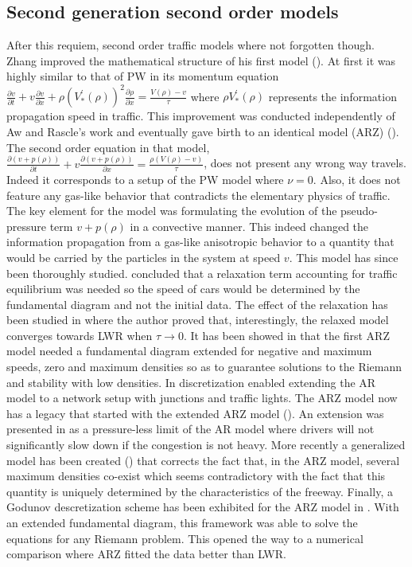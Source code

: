 \documentclass[preprint]{elsarticle}
\begin{document}
\subsection{Second generation second order models}
After this requiem, second order traffic models where not forgotten
though. Zhang improved the mathematical structure of his first model
(\cite{Zhang1998}). At first it was highly similar to that of PW
in its momentum equation $\frac{\partial v}{\partial t}+v\frac{\partial v}{\partial x}+\rho\left(V_{*}^{'}\left(\rho\right)\right)^{2}\frac{\partial\rho}{\partial x}=\frac{V\left(\rho\right)-v}{\tau}$
where $\rho V_{*}^{'}\left(\rho\right)$ represents the information
propagation speed in traffic. This improvement was conducted independently
of Aw and Rascle's work and eventually gave birth to an identical
model (ARZ) (\cite{AR,Z}). The second order equation in that model,
$\frac{\partial\left(v+p\left(\rho\right)\right)}{\partial t}+v\frac{\partial\left(v+p\left(\rho\right)\right)}{\partial x}=\frac{\rho\left(V\left(\rho\right)-v\right)}{\tau}$,
does not present any wrong way travels. Indeed it corresponds to a
setup of the PW model where $\nu=0$. Also, it does not feature any
gas-like behavior that contradicts the elementary physics of traffic.
The key element for the model was formulating the evolution of the
pseudo-pressure term $v+p\left(\rho\right)$ in a convective manner.
This indeed changed the information propagation from a gas-like anisotropic
behavior to a quantity that would be carried by the particles in the
system at speed $v$. This model has since been thoroughly studied.
\cite{AR} concluded that a relaxation term accounting for traffic
equilibrium was needed so the speed of cars would be determined by
the fundamental diagram and not the initial data. The effect of the
relaxation has been studied in \cite{R_improved} where the author
proved that, interestingly, the relaxed model converges towards LWR
when $\tau\rightarrow0$. It has been showed in \cite{Lebacque2007}
that the first ARZ model needed a fundamental diagram extended for
negative and maximum speeds, zero and maximum densities so as to guarantee
solutions to the Riemann and stability with low densities. In \cite{HybridLagrangian2007}
discretization enabled extending the AR model to a network setup with
junctions and traffic lights. The ARZ model now has a legacy that
started with the extended ARZ model (\cite{lebacque2007generic}).
An extension was presented in \cite{berthelin2008model} as a pressure-less
limit of the AR model where drivers will not significantly slow down
if the congestion is not heavy. More recently a generalized model
has been created (\cite{Fan}) that corrects the fact that, in the
ARZ model, several maximum densities co-exist which seems contradictory
with the fact that this quantity is uniquely determined by the characteristics
of the freeway. Finally, a Godunov descretization scheme has been
exhibited for the ARZ model in \cite{GodunovARZ}. With an extended
fundamental diagram, this framework was able to solve the equations
for any Riemann problem. This opened the way to a numerical comparison
where ARZ fitted the data better than LWR.
\end{document}
